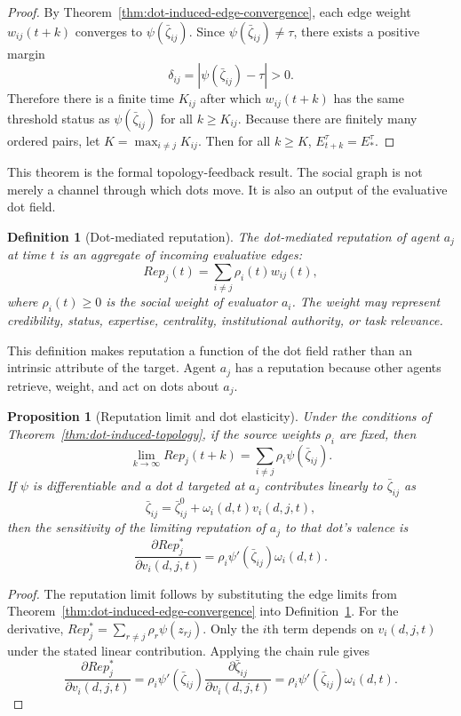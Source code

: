 \documentclass[11pt]{article}
\newtheorem{definition}{Definition}
\newtheorem{proposition}{Proposition}
\theoremstyle{remark}
\begin{document}
\begin{proof}
By Theorem~\ref{thm:dot-induced-edge-convergence}, each edge weight
$w_{ij}(t+k)$ converges to $\psi(\bar{\zeta}_{ij})$. Since
$\psi(\bar{\zeta}_{ij})\neq\tau$, there exists a positive margin
$$
\delta_{ij}=|\psi(\bar{\zeta}_{ij})-\tau|>0.
$$
Therefore there is a finite time $K_{ij}$ after which
$w_{ij}(t+k)$ has the same threshold status as $\psi(\bar{\zeta}_{ij})$ for all
$k\geq K_{ij}$. Because there are finitely many ordered pairs, let
$K=\max_{i\neq j}K_{ij}$. Then for all $k\geq K$,
$E_{t+k}^\tau=E_*^\tau$.
\end{proof}

This theorem is the formal topology-feedback result. The social graph is
not merely a channel through which dots move. It is also an output of the
evaluative dot field.

\begin{definition}[Dot-mediated reputation]\label{def:dot-mediated-reputation}
The dot-mediated reputation of agent $a_j$ at time $t$ is an aggregate
of incoming evaluative edges:
$$
Rep_j(t)=\sum_{i\neq j}\rho_i(t)w_{ij}(t),
$$
where $\rho_i(t)\geq0$ is the social weight of evaluator $a_i$. The
weight may represent credibility, status, expertise, centrality,
institutional authority, or task relevance.
\end{definition}

This definition makes reputation a function of the dot field rather than
an intrinsic attribute of the target. Agent $a_j$ has a reputation
because other agents retrieve, weight, and act on dots about $a_j$.

\begin{proposition}[Reputation limit and dot elasticity]\label{prop:reputation-limit-elasticity}
Under the conditions of Theorem~\ref{thm:dot-induced-topology}, if the
source weights $\rho_i$ are fixed, then
$$
\lim_{k\to\infty}Rep_j(t+k)=\sum_{i\neq j}\rho_i\psi(\bar{\zeta}_{ij}).
$$
If $\psi$ is differentiable and a dot $d$ targeted at $a_j$ contributes
linearly to $\bar{\zeta}_{ij}$ as
$$
\bar{\zeta}_{ij}=\bar{\zeta}_{ij}^{0}+\omega_i(d,t)v_i(d,j,t),
$$
then the sensitivity of the limiting reputation of $a_j$ to that dot's
valence is
$$
\frac{\partial Rep_j^*}{\partial v_i(d,j,t)}
=
\rho_i\psi'(\bar{\zeta}_{ij})\omega_i(d,t).
$$
\end{proposition}

\begin{proof}
The reputation limit follows by substituting the edge limits from
Theorem~\ref{thm:dot-induced-edge-convergence} into
Definition~\ref{def:dot-mediated-reputation}. For the derivative,
$Rep_j^*=\sum_{r\neq j}\rho_r\psi(z_{rj})$. Only the $i$th term depends
on $v_i(d,j,t)$ under the stated linear contribution. Applying the chain
rule gives
$$
\frac{\partial Rep_j^*}{\partial v_i(d,j,t)}
=\rho_i\psi'(\bar{\zeta}_{ij})\frac{\partial \bar{\zeta}_{ij}}{\partial v_i(d,j,t)}
=\rho_i\psi'(\bar{\zeta}_{ij})\omega_i(d,t).
$$
\end{proof}
\end{document}
